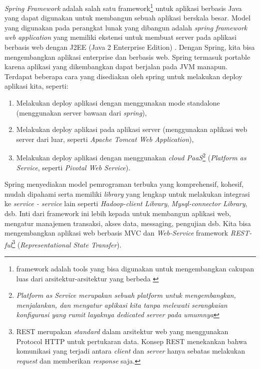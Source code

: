 \textit{Spring Framework} adalah salah satu framework\footnote{framework adalah tools yang bisa digunakan untuk mengembangkan cakupan luas dari arsitektur-arsitektur yang berbeda \cite{setiawan2009pemilihan}} untuk aplikasi berbasis Java yang dapat digunakan untuk membangun sebuah aplikasi berskala besar. Model yang digunakan pada perangkat lunak yang dibangun adalah \textit{spring framework web application} yang memiliki ekstensi untuk membuat server pada aplikasi berbasis web dengan J2EE (Java 2 Enterprise Edition) \cite{SpringCommerceToha:2010}. Dengan Spring, kita bisa mengembangkan aplikasi enterprise dan berbasis web. Spring termasuk portable karena aplikasi yang dikembangkan dapat berjalan pada JVM manapun. Terdapat beberapa cara yang disediakan oleh spring untuk melakukan deploy aplikasi kita, seperti: 
\begin{enumerate}
	\item Melakukan deploy aplikasi dengan menggunakan mode standalone (menggunakan server bawaan dari \textit{spring}),
	\item Melakukan deploy aplikasi pada aplikasi server (menggunakan aplikasi web server dari luar, seperti \textit{Apache Tomcat Web Application}),
	\item Melakukan deploy aplikasi dengan menggunakan \textit{cloud PaaS}\footnote{\textit{Platform as Service merupakan sebuah platform untuk mengembangkan, menjalankan, dan mengatur aplikasi kita tanpa melewati serangkaian konfigurasi yang rumit layaknya \textit{dedicated server} pada umumnya}} (\textit{Platform as Service}, seperti \textit{Pivotal Web Service}).
\end{enumerate}
Spring menyediakan model pemrograman terbuka yang komprehensif, kohesif, mudah dipahami serta memiliki \textit{library} yang lengkap untuk melakukan integrasi ke \textit{service - service} lain seperti \textit{Hadoop-client Library}, \textit{Mysql-connector Library}, dsb. Inti dari framework ini lebih kepada untuk membangun aplikasi web, mengatur manajemen transaksi, akses data, messaging, pengujian dsb. Kita bisa mengembangkan aplikasi web berbasis MVC dan \textit{Web-Service} framework \textit{REST-ful}\footnote{REST merupakan \textit{standard} dalam arsitektur web yang menggunakan Protocol HTTP untuk pertukaran data.  Konsep REST menekankan bahwa komunikasi yang terjadi antara \textit{client} dan \textit{server} hanya sebatas melakukan \textit{request} dan memberikan \textit{response} saja.} (\textit{Representational State Transfer}).

